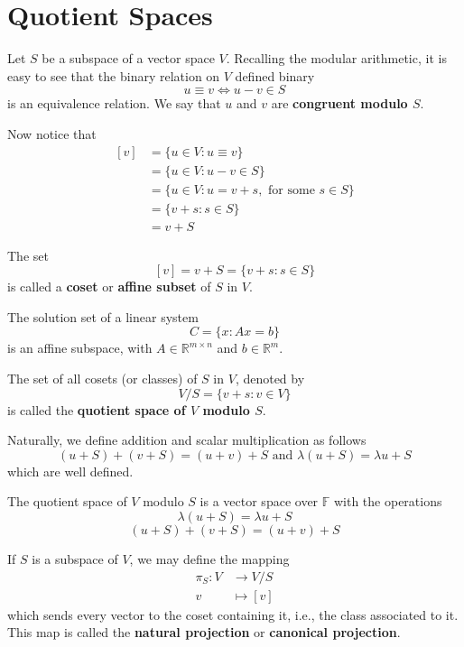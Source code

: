 \chapter{Quotient Spaces}

Let $S$ be a subspace of a vector space $V$. Recalling the modular arithmetic, it is easy to see that the binary relation on $V$ defined binary
\[
	u \equiv v \iff u-v \in S
\]
is an equivalence relation. We say that $u$ and $v$ are \textbf{congruent modulo $S$}.

Now notice that
\begin{equation*}
	\begin{aligned}
		[v] &= \{ u \in V : u \equiv v \} \\
			&= \{ u \in V : u-v \in S \} \\
			&= \{ u \in V : u = v+s, \text{ for some } s \in S \} \\
			&= \{ v + s : s \in S \} \\
			&= v + S
	\end{aligned}
\end{equation*}

The set
\[
	[v] = v + S = \{ v+s : s \in S \}
\]
is called a \textbf{coset} or \textbf{affine subset} of $S$ in $V$.

\begin{example}
	The solution set of a linear system 
	\[
		C = \{ x : Ax = b \}
	\]
	is an affine subspace, with $A \in \mathbb{R}^{m \times n}$ and $b \in \mathbb{R}^m$.
\end{example}

\begin{definition}
	The set of all cosets (or classes) of $S$ in $V$, denoted by
\[
	V / S = \{ v+s : v \in V \}
\]
is called the \textbf{quotient space of $V$ modulo $S$}.
\end{definition}

Naturally, we define addition and scalar multiplication as follows
\[
	(u + S) + (v + S) = (u + v) + S \text{ and } \lambda(u+S) = \lambda u + S
\]
which are well defined.

\begin{theorem}
	The quotient space of $V$ modulo $S$ is a vector space over $\mathbb{F}$ with the operations
	\[
		\lambda(u + S) = \lambda u + S
	\]
	\[
		(u + S) + (v + S) = (u + v) + S
	\]
\end{theorem}

\begin{definition}
	If $S$ is a subspace of $V$, we may define the mapping 
	\begin{equation*}
		\begin{aligned}
			\pi_S : V &\longrightarrow V/S \\
			v &\longmapsto [v]
		\end{aligned}
	\end{equation*}
	which sends every vector to the coset containing it, i.e., the class associated to it. This map is called the \textbf{natural projection} or \textbf{canonical projection}.
\end{definition}

